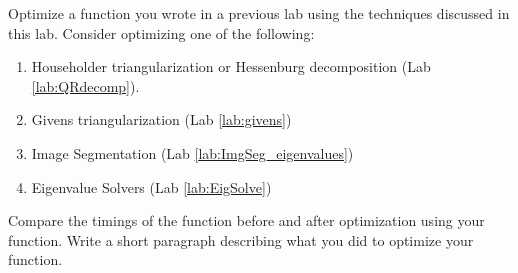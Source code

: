 \begin{problem}
Optimize a function you wrote in a previous lab using the techniques discussed in this lab. Consider optimizing one of the following:
\begin{enumerate}
\item Householder triangularization or Hessenburg decomposition (Lab \ref{lab:QRdecomp}).
\item Givens triangularization (Lab \ref{lab:givens})
\item Image Segmentation (Lab \ref{lab:ImgSeg_eigenvalues})
\item Eigenvalue Solvers (Lab \ref{lab:EigSolve})
\end{enumerate}
 Compare the timings of the function before and after optimization using your  function. Write a short paragraph describing what you did to optimize your function.
\end{problem}
